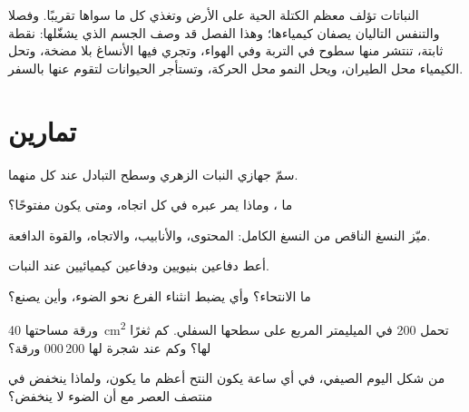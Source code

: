 \begin{remark}\label{rem:g12:plant-rooted-life:half}
النباتات تؤلف معظم الكتلة الحية على الأرض وتغذي كل ما سواها تقريبًا.
وفصلا  والتنفس التاليان يصفان كيمياءها؛ وهذا الفصل قد
وصف الجسم الذي يشغّلها: نقطة ثابتة، تنتشر منها سطوح في التربة وفي
الهواء، وتجري فيها الأنساغ بلا مضخة، وتحل الكيمياء محل الطيران، ويحل
النمو محل الحركة، وتستأجر الحيوانات لتقوم عنها بالسفر.
\end{remark}

\section{تمارين}

\begin{exercise}[$\star$]\label{exo:g12:plant-rooted-life:1}
سمّ جهازي النبات الزهري وسطح التبادل عند كل منهما.
\end{exercise}

\begin{exercise}[$\star$]\label{exo:g12:plant-rooted-life:2}
ما ، وماذا يمر عبره في كل اتجاه، ومتى يكون مفتوحًا؟
\end{exercise}

\begin{exercise}[$\star$]\label{exo:g12:plant-rooted-life:3}
ميّز النسغ الناقص من النسغ الكامل: المحتوى، والأنابيب، والاتجاه،
والقوة الدافعة.
\end{exercise}

\begin{exercise}[$\star$]\label{exo:g12:plant-rooted-life:4}
أعط دفاعين بنيويين ودفاعين كيميائيين عند النبات.
\end{exercise}

\begin{exercise}[$\star$]\label{exo:g12:plant-rooted-life:5}
ما الانتحاء؟ وأي  يضبط انثناء الفرع نحو الضوء، وأين يصنع؟
\end{exercise}

\begin{exercise}[$\star\star$]\label{exo:g12:plant-rooted-life:6}
ورقة مساحتها \qty{40}{cm^2} تحمل 200  في الميليمتر المربع على
سطحها السفلي. كم ثغرًا لها؟ وكم عند شجرة لها 200\,000 ورقة؟
\end{exercise}

\begin{exercise}[$\star\star$]\label{exo:g12:plant-rooted-life:7}
من شكل اليوم الصيفي، في أي ساعة يكون النتح أعظم ما يكون، ولماذا ينخفض
في منتصف العصر مع أن الضوء لا ينخفض؟
\end{exercise}

